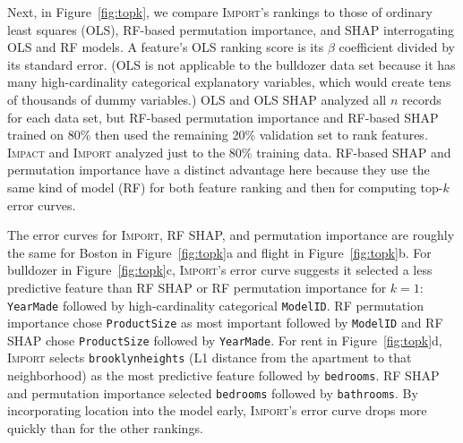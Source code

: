 \documentclass[11pt]{article}
\newcommand{\figref}[1]{Figure~\ref{#1}}
\newcommand{\Imp}{\fontfamily{cmr}\textsc{Impact}}
\newcommand{\Impo}{\fontfamily{cmr}\textsc{Import}}
\begin{document}
Next, in \figref{fig:topk}, we compare \Impo{}'s rankings to those of ordinary least squares (OLS), RF-based permutation importance, and SHAP interrogating OLS and RF models. A feature's OLS ranking score is its $\beta$ coefficient divided by its standard error. (OLS is not applicable to the bulldozer data set because it has many high-cardinality categorical explanatory variables, which would create tens of thousands of dummy variables.) OLS and OLS SHAP analyzed all $n$ records for each data set, but RF-based permutation importance and RF-based SHAP trained on 80\% then used the remaining 20\% validation set to rank features. \Imp{} and \Impo{} analyzed just to the 80\% training data. RF-based SHAP and permutation importance have a distinct advantage here because they use the same kind of model (RF) for both feature ranking and then for computing top-$k$ error curves.

The error curves for \Impo, RF SHAP, and permutation importance are roughly the same for Boston in \figref{fig:topk}a and flight in \figref{fig:topk}b. For bulldozer in \figref{fig:topk}c, \Impo's error curve suggests it selected a less predictive feature than RF SHAP or RF permutation importance for $k=1$: {\tt YearMade}  followed by high-cardinality categorical {\tt ModelID}. RF permutation importance chose {\tt ProductSize} as most important followed by {\tt ModelID} and RF SHAP chose {\tt ProductSize} followed by {\tt YearMade}. For rent in \figref{fig:topk}d, \Impo{} selects {\tt brooklynheights} (L1 distance from the apartment to that neighborhood) as the most predictive feature followed by {\tt bedrooms}.  RF SHAP and permutation importance selected {\tt bedrooms} followed by {\tt bathrooms}.  By incorporating location into the model early, \Impo's error curve drops more quickly than for the other rankings. 
\end{document}

